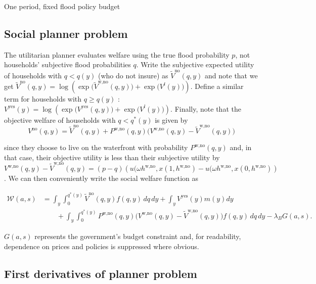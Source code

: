 \documentclass{article}
\begin{document}
\begin{section}{One period, fixed flood policy budget}
\subsection{Social planner problem}

The utilitarian planner evaluates welfare using the true flood probability $p$, not households' subjective flood probabilities $q$. Write the subjective expected utility of households with $q<q(y)$ (who do not insure) as $\tilde V^{\text{no}}(q,y)$ and note that we get $\tilde V^{\text{no}}(q,y) = \log\left(
\exp\big(\tilde V^{\text{w,no}}(q,y)\big)
+
\exp\big(V^l(y)\big)
\right)$. Define a similar term for households with $q\geq q(y)$ : $V^{\text{yes}}(y)=\log\left(
\exp\big(V^{\text{yes}}(q,y)\big)+\exp\big(V^l(y)\big)
\right)$. Finally, note that the objective welfare of households with $q<q^{*}(y)$ is given by 
\begin{equation}
V^{\text{no}}(q,y)=\tilde V^{\text{no}}(q,y)+P^{\text{w,no}}(q,y)\big(V^{\text{w,no}}(q,y)-\tilde V^{\text{w,no}}(q,y)\big)
\end{equation}

since they choose to live on the waterfront with probability $P^{\text{w,no}}(q,y)$ and, in that case, their objective utility is less than their subjective utility by $V^{\text{w,no}}(q,y)-\tilde V^{\text{w,no}}(q,y)=(p-q)\left(u(\omega h^{\text{w,no}}, x(1,h^{\text{w,no}})-u(\omega h^{\text{w,no}}, x(0,h^{\text{w,no}})\right)$. We can then conveniently write the social welfare function as

\begin{align}
\mathcal{W}(a,s)
&=
\int_y\int_{0}^{q^{*}(y)}
\tilde V^{\text{no}}(q,y)f(q,y)\,dq\,dy
+
\int_y
V^{\text{yes}}(y)
m(y)dy
\nonumber\\
&\qquad
+
\int_y\int_{0}^{q^{*}(y)}P^{\text{w,no}}(q,y)
\Big(V^{\text{w,no}}(q,y)-\tilde V^{\text{w,no}}(q,y)\Big)f(q,y)\,dq\,dy
-\lambda_B G(a,s).
\end{align}

$G(a,s)$ represents the government's budget constraint and, for readability, dependence on prices and policies is suppressed where obvious.

\subsection{First derivatives of planner problem}


\end{section}
\end{document}
